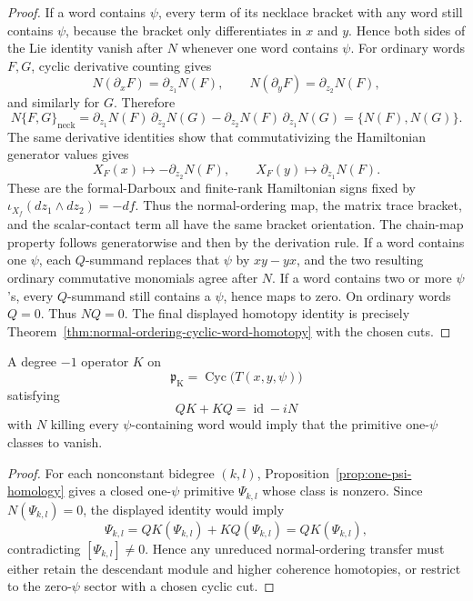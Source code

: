 \documentclass[11pt]{memoir}
\begin{document}
\begin{proof}
	  If a word contains \(\psi\), every term of its necklace bracket with any
	  word still contains \(\psi\), because the bracket only
	  differentiates in \(x\) and \(y\).  Hence both sides of the Lie identity
  vanish after \(N\) whenever one word contains \(\psi\).  For ordinary
  words \(F,G\), cyclic derivative counting gives
  \[
    N(\partial_xF)=\partial_{z_1}N(F),\qquad
    N(\partial_yF)=\partial_{z_2}N(F),
  \]
  and similarly for \(G\).  Therefore
  \[
    N\{F,G\}_{\mathrm{neck}}
      =
      \partial_{z_1}N(F)\,\partial_{z_2}N(G)
      -\partial_{z_2}N(F)\,\partial_{z_1}N(G)
      =\{N(F),N(G)\}.
  \]
  The same derivative identities show that commutativizing the Hamiltonian
  generator values gives
  \[
    X_F(x)\longmapsto-\partial_{z_2}N(F),
    \qquad
    X_F(y)\longmapsto\partial_{z_1}N(F).
  \]
  These are the formal-Darboux and finite-rank Hamiltonian signs fixed by
  \(\iota_{X_f}(dz_1\wedge dz_2)=-df\).  Thus the normal-ordering map,
  the matrix trace bracket, and the scalar-contact term all have the same
  bracket orientation.
  The chain-map property follows generatorwise and then by the derivation
  rule.  If a word contains one \(\psi\), each \(Q\)-summand replaces that
  \(\psi\) by \(xy-yx\), and the two resulting ordinary commutative monomials
  agree after \(N\).  If a word contains two or more \(\psi\)'s, every
  \(Q\)-summand still contains a \(\psi\), hence maps to zero.  On ordinary
  words \(Q=0\).  Thus \(NQ=0\).  The final displayed homotopy identity is precisely
  Theorem~\ref{thm:normal-ordering-cyclic-word-homotopy} with the chosen
  cuts.
\end{proof}

\begin{lem}
\label{lem:cyclic-normal-ordering-contraction-obstruction}
  A degree \(-1\) operator \(K\) on
  \[
    \mathfrak p_{\mathrm K}
      =\operatorname{Cyc}\bigl(T(x,y,\psi)\bigr)
  \]
  satisfying
  \[
    QK+KQ=\operatorname{id}-iN
  \]
  with \(N\) killing every \(\psi\)-containing word would imply that the
  primitive one-\(\psi\) classes to vanish.
\end{lem}

\begin{proof}
  For each nonconstant bidegree \((k,l)\), Proposition~\ref{prop:one-psi-homology}
  gives a closed one-\(\psi\) primitive \(\Psi_{k,l}\) whose class is nonzero.
  Since \(N(\Psi_{k,l})=0\), the displayed identity would imply
  \[
    \Psi_{k,l}=QK(\Psi_{k,l})+KQ(\Psi_{k,l})=QK(\Psi_{k,l}),
  \]
  contradicting \([\Psi_{k,l}]\ne0\).  Hence any unreduced normal-ordering
  transfer must either retain the descendant module and higher coherence
	  homotopies, or restrict to the zero-\(\psi\) sector with a chosen cyclic cut.
\end{proof}
\end{document}
